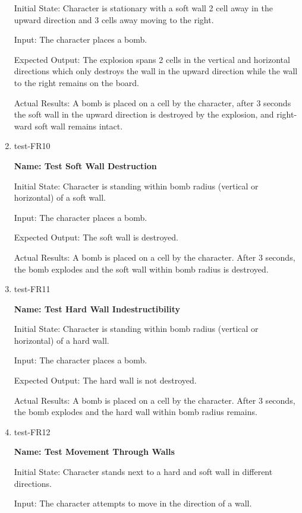 \documentclass[12pt, titlepage]{article}
\begin{document}
\begin{enumerate}
Initial State: Character is stationary with a soft wall 2 cell away in the upward direction and 3 cells away moving to the right. 
					
Input: The character places a bomb.
					
Expected Output: The explosion spans 2 cells in the vertical and horizontal directions which only destroys the wall in the upward direction while the wall to the right remains on the board. 

Actual Results: A bomb is placed on a cell by the character, after 3 seconds the soft wall in the upward direction is destroyed by the explosion, and right-ward soft wall remains intact.  

\item{test-FR10\\}

\textbf{Name: Test Soft Wall Destruction}

Initial State: Character is standing within bomb radius (vertical or horizontal) of a soft wall. 
					
Input: The character places a bomb.
					
Expected Output: The soft wall is destroyed.

Actual Results: A bomb is placed on a cell by the character. After 3 seconds, the bomb explodes and the soft wall within bomb radius is destroyed.  

\item{test-FR11\\}

\textbf{Name: Test Hard Wall Indestructibility}

Initial State: Character is standing within bomb radius (vertical or horizontal) of a hard wall.
					
Input: The character places a bomb.
					
Expected Output: The hard wall is not destroyed.

Actual Results: A bomb is placed on a cell by the character. After 3 seconds, the bomb explodes and the hard wall within bomb radius remains.  

\item{test-FR12\\}

\textbf{Name: Test Movement Through Walls}

Initial State: Character stands next to a hard and soft wall in different directions.
					
Input: The character attempts to move in the direction of a wall.
					

\end{enumerate}
\end{document}
